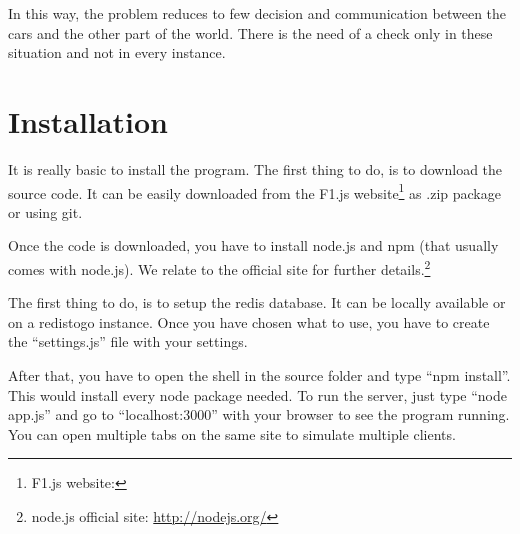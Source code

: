 In this way, the problem reduces to few decision and communication between the cars and the other part of the world. There is the need of a check only in these situation and not in every instance.

\appendix
\section{Installation}

It is really basic to install the program. The first thing to do, is to download the source code. It can be easily downloaded from the F1.js website\footnote{F1.js website: \PROJECTurl} as .zip package or using git.

Once the code is downloaded, you have to install node.js and npm (that usually comes with node.js). We relate to the official site for further details.\footnote{node.js official site: \url{http://nodejs.org/}}

The first thing to do, is to setup the redis database. It can be locally available or on a redistogo instance. Once you have chosen what to use, you have to create the ``settings.js'' file with your settings.

After that, you have to open the shell in the source folder and type ``npm install''. This would install every node package needed. To run the server, just type ``node app.js'' and go to ``localhost:3000'' with your browser to see the program running. You can open multiple tabs on the same site to simulate multiple clients.









